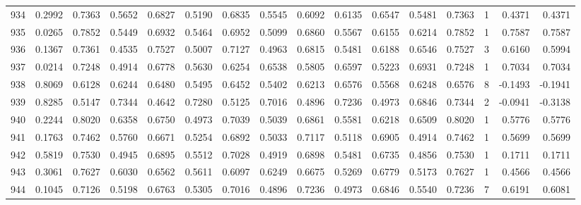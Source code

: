 \begin{tabular}{lrrrrrrrrrrrrrrr}
934 &      0.2992 &  0.7363 &  0.5652 &  0.6827 &  0.5190 &  0.6835 &  0.5545 &  0.6092 &  0.6135 &  0.6547 &   0.5481 &     0.7363 &      1 &                    0.4371 &                     0.4371 \\
935 &      0.0265 &  0.7852 &  0.5449 &  0.6932 &  0.5464 &  0.6952 &  0.5099 &  0.6860 &  0.5567 &  0.6155 &   0.6214 &     0.7852 &      1 &                    0.7587 &                     0.7587 \\
936 &      0.1367 &  0.7361 &  0.4535 &  0.7527 &  0.5007 &  0.7127 &  0.4963 &  0.6815 &  0.5481 &  0.6188 &   0.6546 &     0.7527 &      3 &                    0.6160 &                     0.5994 \\
937 &      0.0214 &  0.7248 &  0.4914 &  0.6778 &  0.5630 &  0.6254 &  0.6538 &  0.5805 &  0.6597 &  0.5223 &   0.6931 &     0.7248 &      1 &                    0.7034 &                     0.7034 \\
938 &      0.8069 &  0.6128 &  0.6244 &  0.6480 &  0.5495 &  0.6452 &  0.5402 &  0.6213 &  0.6576 &  0.5568 &   0.6248 &     0.6576 &      8 &                   -0.1493 &                    -0.1941 \\
939 &      0.8285 &  0.5147 &  0.7344 &  0.4642 &  0.7280 &  0.5125 &  0.7016 &  0.4896 &  0.7236 &  0.4973 &   0.6846 &     0.7344 &      2 &                   -0.0941 &                    -0.3138 \\
940 &      0.2244 &  0.8020 &  0.6358 &  0.6750 &  0.4973 &  0.7039 &  0.5039 &  0.6861 &  0.5581 &  0.6218 &   0.6509 &     0.8020 &      1 &                    0.5776 &                     0.5776 \\
941 &      0.1763 &  0.7462 &  0.5760 &  0.6671 &  0.5254 &  0.6892 &  0.5033 &  0.7117 &  0.5118 &  0.6905 &   0.4914 &     0.7462 &      1 &                    0.5699 &                     0.5699 \\
942 &      0.5819 &  0.7530 &  0.4945 &  0.6895 &  0.5512 &  0.7028 &  0.4919 &  0.6898 &  0.5481 &  0.6735 &   0.4856 &     0.7530 &      1 &                    0.1711 &                     0.1711 \\
943 &      0.3061 &  0.7627 &  0.6030 &  0.6562 &  0.5611 &  0.6097 &  0.6249 &  0.6675 &  0.5269 &  0.6779 &   0.5173 &     0.7627 &      1 &                    0.4566 &                     0.4566 \\
944 &      0.1045 &  0.7126 &  0.5198 &  0.6763 &  0.5305 &  0.7016 &  0.4896 &  0.7236 &  0.4973 &  0.6846 &   0.5540 &     0.7236 &      7 &                    0.6191 &                     0.6081 \\

\end{tabular}
